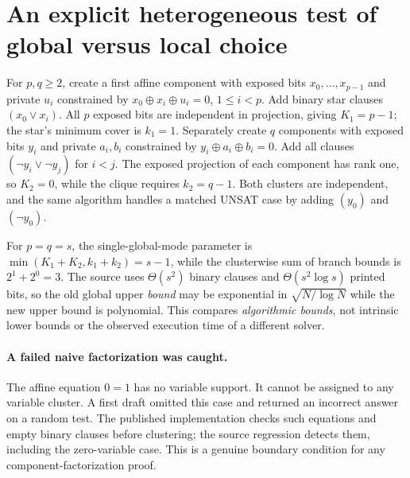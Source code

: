 \documentclass[11pt]{article}
\begin{document}
\section{An explicit heterogeneous test of global versus local choice}
For $p,q\ge2$, create a first affine component with exposed bits $x_0,\ldots,x_{p-1}$ and private $u_i$ constrained by $x_0\oplus x_i\oplus u_i=0$, $1\le i<p$. Add binary star clauses $(x_0\vee x_i)$. All $p$ exposed bits are independent in projection, giving $K_1=p-1$; the star's minimum cover is $k_1=1$. Separately create $q$ components with exposed bits $y_i$ and private $a_i,b_i$ constrained by $y_i\oplus a_i\oplus b_i=0$. Add all clauses $(\neg y_i\vee\neg y_j)$ for $i<j$. The exposed projection of each component has rank one, so $K_2=0$, while the clique requires $k_2=q-1$. Both clusters are independent, and the same algorithm handles a matched UNSAT case by adding $(y_0)$ and $(\neg y_0)$.

For $p=q=s$, the single-global-mode parameter is $\min(K_1+K_2,k_1+k_2)=s-1$, while the clusterwise sum of branch bounds is $2^{1}+2^{0}=3$. The source uses $\Theta(s^2)$ binary clauses and $\Theta(s^2\log s)$ printed bits, so the old global upper \emph{bound} may be exponential in $\sqrt{N/\log N}$ while the new upper bound is polynomial. This compares \emph{algorithmic bounds}, not intrinsic lower bounds or the observed execution time of a different solver.

\paragraph{A failed naive factorization was caught.} The affine equation $0=1$ has no variable support. It cannot be assigned to any variable cluster. A first draft omitted this case and returned an incorrect answer on a random test. The published implementation checks such equations and empty binary clauses before clustering; the source regression detects them, including the zero-variable case. This is a genuine boundary condition for any component-factorization proof.
\end{document}

